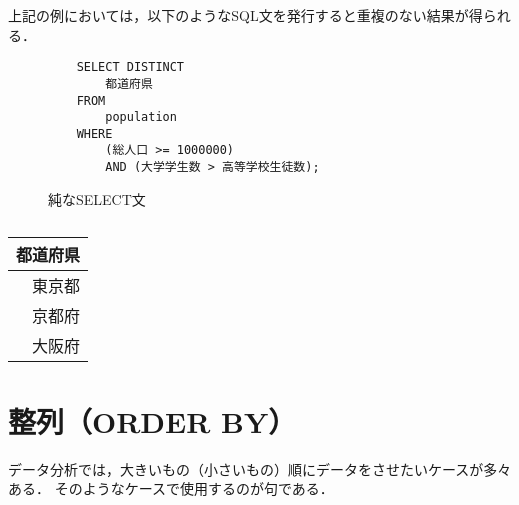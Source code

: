 上記の例においては，以下のようなSQL文を発行すると重複のない結果が得られる．
\begin{figure}[tb]
    \begin{verbatim}
    SELECT DISTINCT
        都道府県
    FROM
        population
    WHERE
        (総人口 >= 1000000)
        AND (大学学生数 > 高等学校生徒数);
    \end{verbatim}
    \captionsetup{name=コード}
    \caption{純なSELECT文}
    \label{code:sql-where3}
\end{figure}
\begin{table}[tb]
    \centering
    \begin{tabular}{r}
    \toprule
    \textbf{都道府県} \\ \midrule
    東京都           \\
    京都府           \\
    大阪府           \\ \bottomrule
    \end{tabular}
    \caption{}
    \label{tb:}
\end{table}

\section{整列（ORDER BY）}
データ分析では，大きいもの（小さいもの）順にデータをさせたいケースが多々ある． そのようなケースで使用するのが句である．


